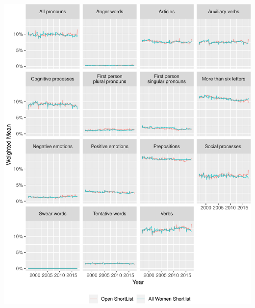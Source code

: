 \documentclass[]{article}
\let\origfigure\figure
\let\endorigfigure\endfigure
\renewenvironment{figure}[1][2] {
    \expandafter\origfigure\expandafter[H]
} {
    \endorigfigure
}
\begin{document}
\begin{figure}
\centering
\includegraphics{methodology_files/figure-latex/sl-key-date-1.pdf}
\caption{\label{sl-key-date}Occurence of selected LIWC terms, by date}
\end{figure}
\end{document}
